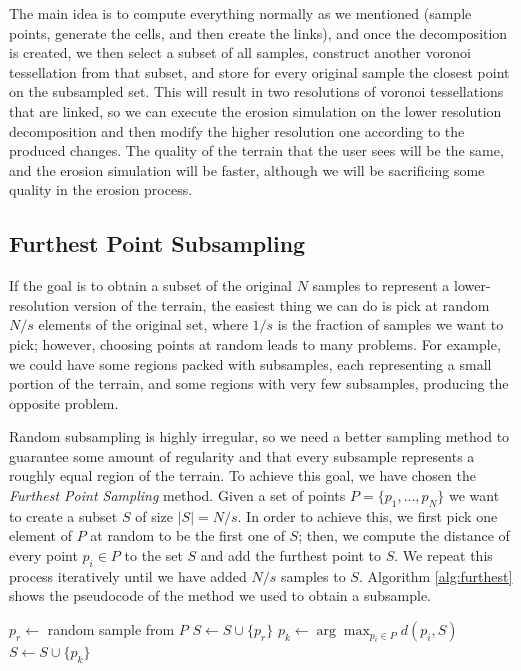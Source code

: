 The main idea is to compute everything normally as we mentioned (sample 
points, generate the cells, and then create the links), and once the 
decomposition is created, we then select a subset of all samples, construct 
another voronoi tessellation from that subset, and store for every 
original sample the closest point on the subsampled set. This will 
result in two resolutions of voronoi tessellations that are linked, so
we can execute the erosion simulation on the lower resolution decomposition 
and then modify the higher resolution one according to the produced changes.
The quality of the terrain that the user sees will be the same, and 
the erosion simulation will be faster, although we will be sacrificing 
some quality in the erosion process.

\subsection{Furthest Point Subsampling}
If the goal is to obtain a subset of the original $N$ samples 
to represent a lower-resolution version of the terrain, the easiest thing we 
can do is pick at random $N/s$ elements of the original set, where $1/s$ 
is the fraction of samples we want to pick; however, choosing points 
at random leads to many problems. For example, we could have some 
regions packed with subsamples, each representing a small portion 
of the terrain, and some regions with very few subsamples, producing the opposite 
problem.

\vspace{10pt}

Random subsampling is highly irregular, so we need a better sampling 
method to guarantee some amount of regularity and that every subsample 
represents a roughly equal region of the terrain. To achieve this goal, 
we have chosen the \textit{Furthest Point Sampling} method. Given 
a set of points $P = \{p_1, \hdots , p_N\}$ we want to create a subset $S$
of size $|S| = N/s$. In order to achieve this, we first pick one element of $P$
at random to be the first one of $S$; then, we compute the distance of every
point $p_i \in P$ to the set $S$ and add the furthest point to $S$. We repeat 
this process iteratively
until we have added $N/s$ samples to $S$. Algorithm \ref{alg:furthest} shows the pseudocode of the method we used 
to obtain a subsample.

\vspace{10pt}

\begin{algorithm}
\caption{Furthest Point Sampling} \label{alg:furthest}
\begin{algorithmic}
\State $p_r \gets$ random sample from $P$
\State $S \gets S \cup \{p_r\}$
    \State $p_k \gets \arg \max_{p_i \in P} d(p_i, S)$
    \State $S \gets S \cup \{p_k\}$
\EndWhile

\end{algorithmic}
\end{algorithm}

